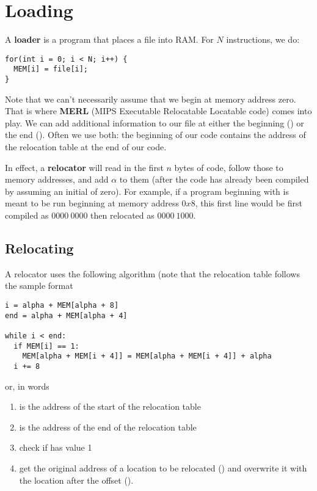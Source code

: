 \documentclass[12pt]{article}
\begin{document}
\section*{Loading}
A {\bf loader} is a program that places a file into RAM. For $N$ instructions, we do:

\begin{verbatim}
for(int i = 0; i < N; i++) {
  MEM[i] = file[i];
}
\end{verbatim}

Note that we can't necessarily assume that we begin at memory address zero. That is where {\bf MERL} (MIPS Executable Relocatable Locatable code) comes into play. We can add additional information to our file at either the beginning () or the end (). Often we use both: the beginning of our code contains the address of the relocation table at the end of our code.

In effect, a {\bf relocator} will read in the first $n$ bytes of code, follow those to memory addresses, and add $\alpha$ to them (after the code has already been compiled by assuming an initial  of zero). For example, if a program beginning with  is meant to be run beginning at memory address $0x8$, this first line would be first compiled as $0000\ 0000$ then relocated as $0000\ 1000$.

\subsection*{Relocating}
A relocator uses the following algorithm (note that the relocation table follows the sample format 

\begin{verbatim}
i = alpha + MEM[alpha + 8]
end = alpha + MEM[alpha + 4]

while i < end:
  if MEM[i] == 1:
    MEM[alpha + MEM[i + 4]] = MEM[alpha + MEM[i + 4]] + alpha
  i += 8
\end{verbatim}

or, in words

\begin{enumerate}
\item {} is the address of the start of the relocation table
\item {} is the address of the end of the relocation table
\item check if  has value 1
\item get the original address of a location to be relocated () and overwrite it with the location after the offset ().
\end{enumerate}
\end{document}
